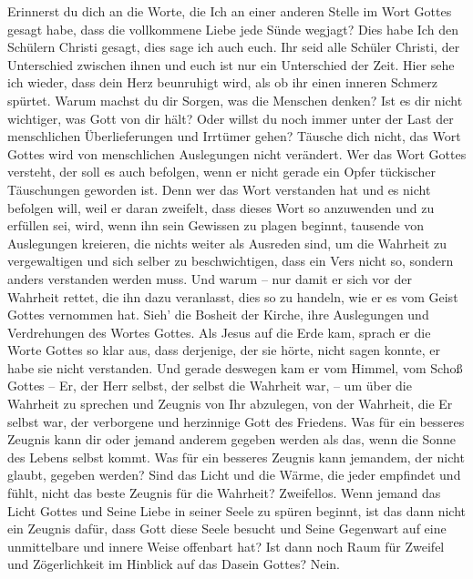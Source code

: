Erinnerst du dich an die Worte, die Ich an einer anderen Stelle im Wort Gottes gesagt habe, dass die vollkommene Liebe jede Sünde wegjagt? Dies habe Ich den Schülern Christi gesagt, dies sage ich auch euch. Ihr seid alle Schüler Christi, der Unterschied zwischen ihnen und euch ist nur ein Unterschied der Zeit. Hier sehe ich wieder, dass dein Herz beunruhigt wird, als ob ihr einen inneren Schmerz spürtet. Warum machst du dir Sorgen, was die Menschen denken? Ist es dir nicht wichtiger, was Gott von dir hält? Oder willst du noch immer unter der Last der menschlichen Überlieferungen und Irrtümer gehen? Täusche dich nicht, das Wort Gottes wird von menschlichen Auslegungen nicht verändert. Wer das Wort Gottes versteht, der soll es auch befolgen, wenn er nicht gerade ein Opfer tückischer Täuschungen geworden ist. Denn wer das Wort verstanden hat und es nicht befolgen will, weil er daran zweifelt, dass dieses Wort so anzuwenden und zu erfüllen sei, wird, wenn ihn sein Gewissen zu plagen beginnt, tausende von Auslegungen kreieren, die nichts weiter als Ausreden sind, um die Wahrheit zu vergewaltigen und sich selber zu beschwichtigen, dass ein Vers nicht so, sondern anders verstanden werden muss. Und warum -- nur damit er sich vor der Wahrheit rettet, die ihn dazu veranlasst, dies so zu handeln, wie er es vom Geist Gottes vernommen hat. Sieh' die Bosheit der Kirche, ihre Auslegungen und Verdrehungen des Wortes Gottes. Als Jesus auf die Erde kam, sprach er die Worte Gottes so klar aus, dass derjenige, der sie hörte, nicht sagen konnte, er habe sie nicht verstanden. Und gerade deswegen kam er vom Himmel, vom Schoß Gottes -- Er, der Herr selbst, der selbst die Wahrheit war, -- um über die Wahrheit zu sprechen und Zeugnis von Ihr abzulegen, von der Wahrheit, die Er selbst war, der verborgene und herzinnige Gott des Friedens. Was für ein besseres Zeugnis kann dir oder jemand anderem gegeben werden als das, wenn die Sonne des Lebens selbst kommt. Was für ein besseres Zeugnis kann jemandem, der nicht glaubt, gegeben werden? Sind das Licht und die Wärme, die jeder empfindet und fühlt, nicht das beste Zeugnis für die Wahrheit? Zweifellos. Wenn jemand das Licht Gottes und Seine Liebe in seiner Seele zu spüren beginnt, ist das dann nicht ein Zeugnis dafür, dass Gott diese Seele besucht und Seine Gegenwart auf eine unmittelbare und innere Weise offenbart hat? Ist dann noch Raum für Zweifel und Zögerlichkeit im Hinblick auf das Dasein Gottes? Nein.

